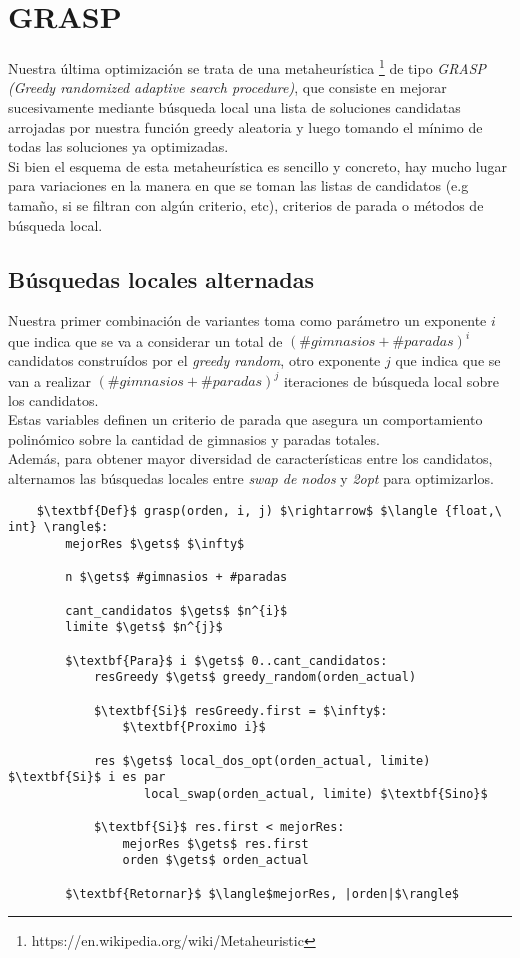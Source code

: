 \section{GRASP}
Nuestra última optimización se trata de una metaheurística \footnote{https://en.wikipedia.org/wiki/Metaheuristic} de tipo \emph{GRASP (Greedy randomized adaptive search procedure)}, que consiste en mejorar sucesivamente mediante búsqueda local una lista de soluciones candidatas arrojadas por nuestra función greedy aleatoria y luego tomando el mínimo de todas las soluciones ya optimizadas.
\\

Si bien el esquema de esta metaheurística es sencillo y concreto, hay mucho lugar para variaciones en la manera en que se toman las listas de candidatos (e.g tamaño, si se filtran con algún criterio, etc), criterios de parada o métodos de búsqueda local.
\\

\subsection{Búsquedas locales alternadas}
Nuestra primer combinación de variantes toma como parámetro un exponente $i$ que indica que se va a considerar un total de $(\#gimnasios + \#paradas)^i$ candidatos construídos por el \emph{greedy random}, otro exponente $j$ que indica que se van a realizar $(\#gimnasios + \#paradas)^j$ iteraciones de búsqueda local sobre los candidatos.
\\

Estas variables definen un criterio de parada que asegura un comportamiento polinómico sobre la cantidad de gimnasios y paradas totales.
\\

Además, para obtener mayor diversidad de características entre los candidatos, alternamos las búsquedas locales entre \emph{swap de nodos} y \emph{2opt} para optimizarlos.

\begin{lstlisting}
    $\textbf{Def}$ grasp(orden, i, j) $\rightarrow$ $\langle {float,\ int} \rangle$:
        mejorRes $\gets$ $\infty$

        n $\gets$ #gimnasios + #paradas

        cant_candidatos $\gets$ $n^{i}$
        limite $\gets$ $n^{j}$

        $\textbf{Para}$ i $\gets$ 0..cant_candidatos:
            resGreedy $\gets$ greedy_random(orden_actual)

            $\textbf{Si}$ resGreedy.first = $\infty$:
                $\textbf{Proximo i}$

            res $\gets$ local_dos_opt(orden_actual, limite) $\textbf{Si}$ i es par
                   local_swap(orden_actual, limite) $\textbf{Sino}$

            $\textbf{Si}$ res.first < mejorRes:
                mejorRes $\gets$ res.first
                orden $\gets$ orden_actual

        $\textbf{Retornar}$ $\langle$mejorRes, |orden|$\rangle$
\end{lstlisting}
